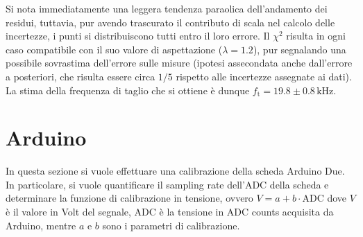 \documentclass[a4paper,11pt]{article} %
\begin{document}
\noindent Si nota immediatamente una leggera tendenza paraolica dell'andamento dei residui, tuttavia, pur avendo
trascurato il contributo di scala nel calcolo delle incertezze, i punti si distribuiscono tutti entro il loro errore. Il
$\chi^2$ risulta in ogni caso compatibile con il suo valore di aspettazione ($\lambda = 1.2$), pur segnalando una
possibile sovrastima dell'errore sulle misure (ipotesi assecondata anche dall'errore a posteriori, che risulta essere
circa $1/5$ rispetto alle incertezze assegnate ai dati). La stima della frequenza di taglio che si ottiene è dunque
$f_{\text{t}} = 19.8\pm 0.8\,\si{\kHz}$.





























\section{Arduino}
In questa sezione si vuole effettuare una calibrazione della scheda Arduino Due. In particolare, si vuole quantificare
il sampling rate dell'ADC della scheda e determinare la funzione di calibrazione in tensione, ovvero $V = a
+ b \cdot \text{ADC}$ dove $V$ è il valore in Volt del segnale, $\text{ADC}$ è la tensione in ADC counts acquisita da
Arduino, mentre $a$ e $b$ sono i parametri di calibrazione. 

\end{document}
